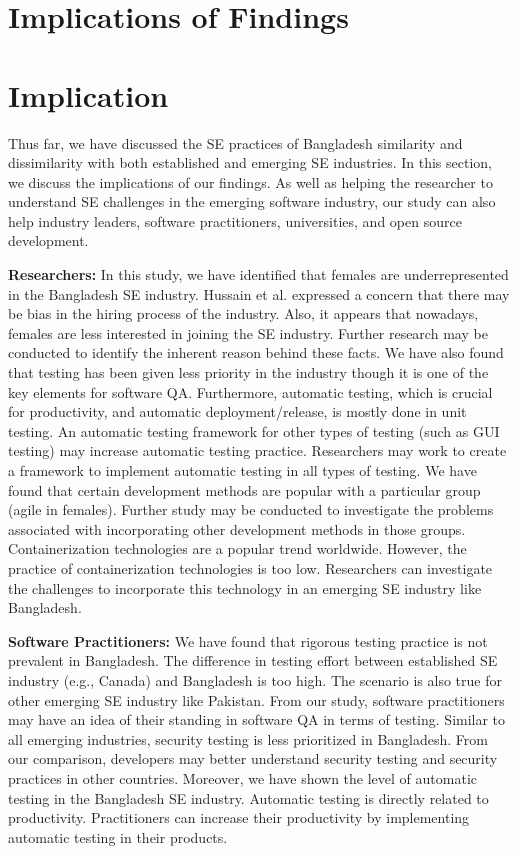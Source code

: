 \section{Implications of Findings}


\section{Implication}
\label{implications}
Thus far, we have discussed the SE practices of Bangladesh similarity and dissimilarity with both established and emerging SE industries. In this section, we discuss the implications of our findings. As well as helping the researcher to understand SE challenges in the emerging software industry, our study can also help industry leaders, software practitioners, universities, and open source development.

\indent \textbf{Researchers:} In this study, we have identified that females are underrepresented in the Bangladesh SE industry. Hussain et al.\cite{Hussain2020} expressed a concern that there may be bias in the hiring process of the industry. Also, it appears that nowadays, females are less interested in joining the SE industry. Further research may be conducted to identify the inherent reason behind these facts. We have also found that testing has been given less priority in the industry though it is one of the key elements for software QA. Furthermore, automatic testing, which is crucial for productivity, and automatic deployment/release, is mostly done in unit testing. An automatic testing framework for other types of testing (such as GUI testing) may increase automatic testing practice. Researchers may work to create a framework to implement automatic testing in all types of testing. We have found that certain development methods are popular with a particular group (agile in females). Further study may be conducted to investigate the problems associated with incorporating other development methods in those groups. Containerization technologies are a popular trend worldwide. However, the practice of containerization technologies is too low. Researchers can investigate the challenges to incorporate this technology in an emerging SE industry like Bangladesh.

\indent \textbf{Software Practitioners:}  We have found that rigorous testing practice is not prevalent in Bangladesh. The difference in testing effort between established SE industry (e.g., Canada) and Bangladesh is too high. The scenario is also true for other emerging SE industry like Pakistan. From our study, software practitioners may have an idea of their standing in software QA in terms of testing. Similar to all emerging industries, security testing is less prioritized in Bangladesh. From our comparison, developers may better understand security testing and security practices in other countries. Moreover, we have shown the level of automatic testing in the Bangladesh SE industry. Automatic testing is directly related to productivity. Practitioners can increase their productivity by implementing automatic testing in their products.

